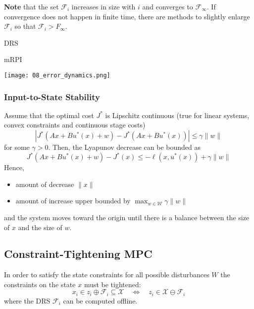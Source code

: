 \textbf{Note} that the set $\mathcal{F}_i$ increases in size with $i$ and converges to $\mathcal{F}_\infty$. If convergence does not happen in finite time, there are methods to slightly enlarge $\mathcal{F}_i$ so that $\mathcal{F}_i>F_\infty$.

\begin{minipage}[t]{0.5\linewidth}
    \centering
    DRS
\end{minipage}
\begin{minipage}[t]{0.5\linewidth}
    \centering
    mRPI
\end{minipage}
\begin{center}
    \texttt{[image: 08\_error\_dynamics.png]}
\end{center}

\subsubsection{Input-to-State Stability}
Assume that the optimal cost $J^*$ is Lipschitz continuous (true for linear systems, convex constraints and continuous stage costs)
\begin{equation*}
    |J^*(A x + B u^*(x) + w) - J^*(A x + B u^*(x))| \leq \gamma \|w\|
\end{equation*}
for some $\gamma > 0$.
\newpar{}
Then, the Lyapunov decrease can be bounded as
\begin{equation*}
    J^*(A x + B u^*(x) + w) - J^*(x)\leq -\ell(x, u^*(x)) + \gamma \|w\|
\end{equation*}
Hence,
\begin{itemize}
    \item amount of decrease $\|x\|$
    \item amount of increase upper bounded by $\max_{w \in \mathcal{W}} \gamma \|w\|$
\end{itemize}
and the system moves toward the origin until there is a balance between the size of $x$ and the size of $w$.

\subsection{Constraint-Tightening MPC}

In order to satisfy the state constraints for all possible disturbances $W$ the constraints on the state $x$ must be tightened:
\begin{equation*}
    x_i \in z_i \oplus \mathcal{F}_i \subseteq \mathcal{X} \quad \Leftrightarrow \quad z_i \in \mathcal{X}\ominus \mathcal{F}_i
\end{equation*}
where the DRS $\mathcal{F}_i$ can be computed offline.

